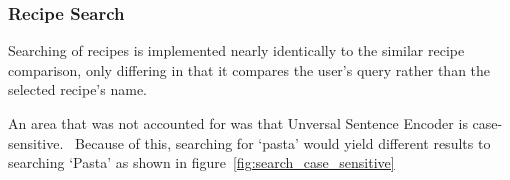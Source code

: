 \begin{table}[p]
    \centering
    \caption{\label{tab:similar}Similar recipes for \enquote*{Spaghetti} and \enquote*{Apple Crumble}. Most results are omitted for brevity.}
    \quad
\end{table}

\subsubsection{Recipe Search}

Searching of recipes is implemented nearly identically to the similar recipe comparison, only differing in that
it compares the user's query rather than the selected recipe's name.

An area that was not accounted for was that Unversal Sentence Encoder is case-sensitive.~
Because of this, searching for \enquote*{pasta} would yield different results to searching \enquote*{Pasta} as
shown in figure~\ref{fig:search_case_sensitive}

